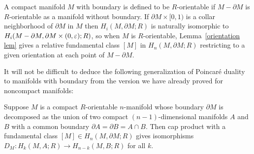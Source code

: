 A compact manifold $M$ with boundary is defined to be $R$-orientable if $M-\partial M$ is $R$-orientable as a manifold without boundary. If $\partial M\times[0,1)$ is a collar neighborhood of $\partial M$ in $M$ then $H_i(M,\partial M;R)$ is naturally isomorphic to $H_i(M-\partial M,\partial M\times(0,\varepsilon);R)$, so when $M$ is $R$-orientable, Lemma~\ref{orientation lem} gives a relative fundamental class $[M]$ in $H_n(M,\partial M;R)$ restricting to a given orientation at each point of $M-\partial M$.\par
It will not be difficult to deduce the following generalization of Poincar\'e duality to manifolds with boundary from the version we have already proved for noncompact manifolds:
\begin{theorem}
Suppose $M$ is a compact $R$-orientable $n$-manifold whose boundary $\partial M$ is decomposed as the union of two compact $(n-1)$-dimensional manifolds $A$ and $B$ with a common boundary $\partial A=\partial B=A\cap B$. Then cap product with a fundamental class $[M]\in H_n(M,\partial M;R)$ gives isomorphisms $D_M:H_k(M,A;R)\to H_{n-k}(M,B;R)$ for all $k$.
\end{theorem}
